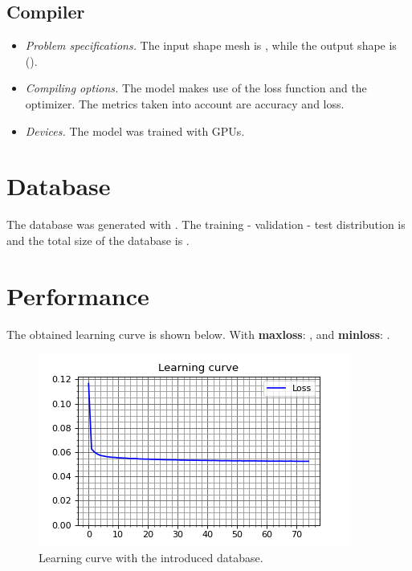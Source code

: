 \documentclass[a4paper, 11pt, margin=1in]{journal}
\begin{document}
\vspace{1cm}

\subsection{Compiler}

\begin{itemize}
    \item \textit{Problem specifications.} The input shape mesh is \textit{\modeli}, while the output shape is (\textit{\modelo}).
    \item \textit{Compiling options.} The model makes use of the \textit{\modelloss} loss function and the \textit{\modelopt} optimizer. The metrics taken into account are accuracy and loss.
    \item \textit{Devices.} The model was trained with \modeldevs GPUs.
\end{itemize}
\section{Database}

The database \textbf{\dbname} was generated with \textit{\dbtype}. The training - validation - test distribution is \textit{\dbdist} and the total size of the database is \textit{\dbsize}. 

\section{Performance}

The obtained learning curve is shown below. With \textbf{maxloss}: \maxloss, and \textbf{minloss}: \minloss.\\

\begin{figure}[h!]
    \centering
    \includegraphics[width=\textwidth]{imgs/learning}
    \caption{Learning curve with the introduced database.}
\end{figure}
\end{document}
